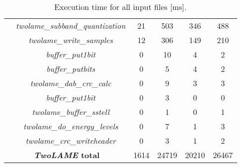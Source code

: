 \begin{table}[H]
\begin{tabular}{|c|c|c|c|c|c|}
    \cline{2-6}
    & \multicolumn{1}{c|}{\textit{twolame\_subband\_quantization}} & 21 & 503 & 346 & 488 \\
    \cline{2-6}
    & \multicolumn{1}{c|}{\textit{twolame\_write\_samples}} & 12 & 306 & 149 & 210 \\
    \cline{2-6}
    & \multicolumn{1}{c|}{\textit{buffer\_put1bit}} & 0 & 10 & 4 & 2 \\
    \cline{2-6}
    & \multicolumn{1}{c|}{\textit{buffer\_putbits}} & 0 & 5 & 4 & 2 \\
    \cline{2-6}
    & \multicolumn{1}{c|}{\textit{twolame\_dab\_crc\_calc}} & 0 & 9 & 3 &  3 \\
    \cline{2-6}
    & \multicolumn{1}{c|}{\textit{buffer\_put1bit}} & 0 & 3 & 0 &  0 \\
    \cline{2-6}
    & \multicolumn{1}{c|}{\textit{twolame\_buffer\_sstell}} & 0 & 1 & 0 & 1  \\
    \cline{2-6}
    & \multicolumn{1}{c|}{\textit{twolame\_do\_energy\_levels}} & 0 & 7 & 1 & 3  \\
    \cline{2-6}
    & \multicolumn{1}{c|}{\textit{twolame\_crc\_writeheader}} & 0 & 3 & 1 &  2  \\ 
    \hline
    \multicolumn{2}{|c|}{\textbf{\textit{TwoLAME} total}}  & 1614 & 24719 & 20210 & 26467 \\ 
    \hline
    \end{tabular}
    \caption{Execution time for all input files [ms].}
    \label{profiling2}
\end{table}

\vspace{1cm}

